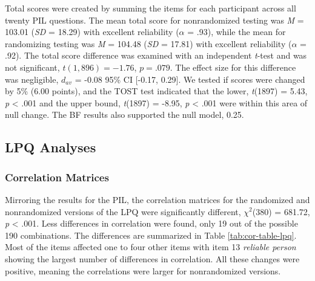 \documentclass[english,man, mask]{apa6}
\theoremstyle{definition}
\theoremstyle{definition}
\theoremstyle{definition}
\theoremstyle{remark}
\begin{document}
Total scores were created by summing the items for each participant
across all twenty PIL questions. The mean total score for nonrandomized
testing was \emph{M} = 103.01 (\emph{SD} = 18.29) with excellent
reliability (\(\alpha\) = .93), while the mean for randomizing testing
was \emph{M} = 104.48 (\emph{SD} = 17.81) with excellent reliability
(\(\alpha\) = .92). The total score difference was examined with an
independent \emph{t}-test and was not significant, \(t(1,896) = -1.76\),
\(p = .079\). The effect size for this difference was negligible,
\(d_{av}\) = -0.08 95\% CI {[}-0.17, 0.29{]}. We tested if scores were
changed by 5\% (6.00 points), and the TOST test indicated that the
lower, \emph{t}(1897) = 5.43, \emph{p} \textless{} .001 and the upper
bound, \emph{t}(1897) = -8.95, \emph{p} \textless{} .001 were within
this area of null change. The BF results also supported the null model,
0.25.

\subsection{LPQ Analyses}\label{lpq-analyses}

\subsubsection{Correlation Matrices}\label{correlation-matrices-1}

Mirroring the results for the PIL, the correlation matrices for the
randomized and nonrandomized versions of the LPQ were significantly
different, \(\chi^2\)(380) = 681.72, \emph{p} \textless{} .001. Less
differences in correlation were found, only 19 out of the possible 190
combinations. The differences are summarized in Table
\ref{tab:cor-table-lpq}. Most of the items affected one to four other
items with item 13 \emph{reliable person} showing the largest number of
differences in correlation. All these changes were positive, meaning the
correlations were larger for nonrandomized versions.
\end{document}
